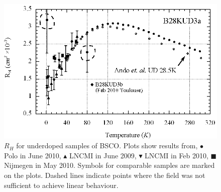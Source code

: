 \begin{figure}[htbp]
	\begin{center}
		\includegraphics[scale=0.9]{Chapter-HallBSCO/Figures/HallIndividual/HallIndividualUD}
		\caption{$R_H$ for underdoped samples of \ac{BSCO}. Plots show results from, $\bullet$ Polo in June 2010, $\blacktriangle$ \ac{LNCMI} in June 2009, $\blacktriangledown$ \ac{LNCMI} in Feb 2010, $\blacksquare$ Nijmegen in May 2010. Symbols for comparable samples are marked on the plots. Dashed lines indicate points where the field was not sufficient to achieve linear behaviour.}
		\label{Fig:ExpH:HallIndividualUD}
	\end{center}
\end{figure}
